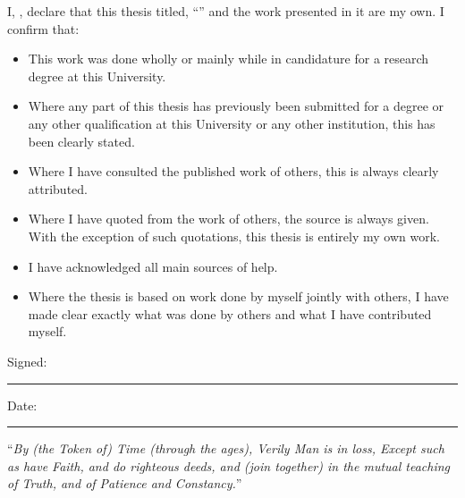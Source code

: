 \documentclass[
11pt, %
english, %
singlespacing, %
headsepline, %
]{MastersDoctoralThesis} %
\begin{document}

\begin{declaration}
\addchaptertocentry{\authorshipname}

\noindent I, \authorname, declare that this thesis titled, \enquote{\ttitle} and the work presented in it are my own. I confirm that:

\begin{itemize} 
\item This work was done wholly or mainly while in candidature for a research degree at this University.
\item Where any part of this thesis has previously been submitted for a degree or any other qualification at this University or any other institution, this has been clearly stated.
\item Where I have consulted the published work of others, this is always clearly attributed.
\item Where I have quoted from the work of others, the source is always given. With the exception of such quotations, this thesis is entirely my own work.
\item I have acknowledged all main sources of help.
\item Where the thesis is based on work done by myself jointly with others, I have made clear exactly what was done by others and what I have contributed myself.\\
\end{itemize}
 
\noindent Signed:\\
\rule[0.5em]{25em}{0.5pt} %
 
\noindent Date:\\
\rule[0.5em]{25em}{0.5pt} %
\end{declaration}

\cleardoublepage


\vspace*{0.2\textheight}

\noindent\enquote{\itshape  By (the Token of) Time (through the ages), Verily Man is in loss, Except such as have Faith, and do righteous deeds, and (join together) in the mutual teaching of Truth, and of Patience and Constancy.}\bigbreak
\end{document}
